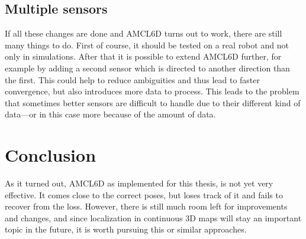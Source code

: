 \documentclass[Thesis.tex]{subfiles}
\begin{document}
\subsection*{Multiple sensors}

If all these changes are done and \gls{AMCL6D} turns out to work, there are still many things to do. First of course, it should be tested on a real robot and not only in simulations. After that it is possible to extend \gls{AMCL6D} further, for example by adding a second sensor which is directed to another direction than the first. This could help to reduce ambiguities and thus lead to faster convergence, but also introduces more data to process. This leads to the problem that sometimes better sensors are difficult to handle due to their different kind of data\cite{Smithers:1994}---or in this case more because of the amount of data.

\section*{Conclusion}

As it turned out, \gls{AMCL6D} as implemented for this thesis, is not yet very effective. It comes close to the correct poses, but loses track of it and fails to recover from the loss. However, there is still much room left for improvements and changes, and since localization in continuous 3D maps will stay an important topic in the future, it is worth pursuing this or similar approaches. 
\end{document}

